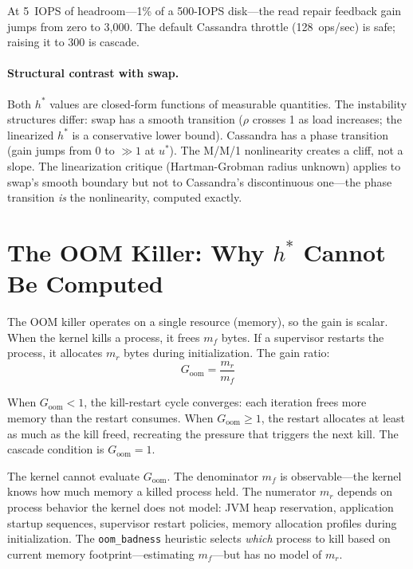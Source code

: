 \documentclass[11pt]{article}
\begin{document}
At 5~IOPS of headroom---1\% of a 500-IOPS disk---the read repair feedback gain
jumps from zero to 3{,}000. The default Cassandra throttle (128~ops/sec) is
safe; raising it to 300 is cascade.

\paragraph{Structural contrast with swap.} Both $h^*$ values are closed-form
functions of measurable quantities. The instability structures differ: swap has a
smooth transition ($\rho$ crosses 1 as load increases; the linearized $h^*$ is a
conservative lower bound). Cassandra has a phase transition (gain jumps from 0 to
$\gg 1$ at $u^*$). The M/M/1 nonlinearity creates a cliff, not a slope. The
linearization critique (Hartman-Grobman radius unknown) applies to swap's smooth
boundary but not to Cassandra's discontinuous one---the phase transition
\emph{is} the nonlinearity, computed exactly.

\section{The OOM Killer: Why $h^*$ Cannot Be Computed}
\label{sec:oom-hstar}

The OOM killer operates on a single resource (memory), so the gain is scalar.
When the kernel kills a process, it frees $m_f$ bytes. If a supervisor restarts
the process, it allocates $m_r$ bytes during initialization. The gain ratio:
\begin{equation}
  G_{\mathrm{oom}} = \frac{m_r}{m_f}
\end{equation}

When $G_{\mathrm{oom}} < 1$, the kill-restart cycle converges: each iteration
frees more memory than the restart consumes. When
$G_{\mathrm{oom}} \geq 1$, the restart allocates at least as much as the kill
freed, recreating the pressure that triggers the next kill. The cascade
condition is $G_{\mathrm{oom}} = 1$.

The kernel cannot evaluate $G_{\mathrm{oom}}$. The denominator $m_f$ is
observable---the kernel knows how much memory a killed process held. The
numerator $m_r$ depends on process behavior the kernel does not model: JVM heap
reservation, application startup sequences, supervisor restart policies, memory
allocation profiles during initialization. The \texttt{oom\_badness} heuristic
selects \emph{which} process to kill based on current memory
footprint---estimating $m_f$---but has no model of $m_r$.
\end{document}

